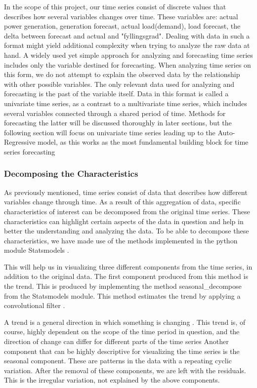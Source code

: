 \documentclass
[twocolumn,
secnumarabic,
nobibnotes,
aps,
prl,
reprint,
groupedaddress,
amsmath,
amssymb,
]{revtex4-2}
\begin{document}
In the scope of this project, our time series consist of discrete values that describes how several variables changes over time. These variables are: actual power generation, generation forecast, actual load(demand), load forecast, the delta between forecast and actual and "fyllingsgrad". Dealing with data in such a format might yield additional complexity when trying to analyze the raw data at hand. A widely used yet simple approach for analyzing and forecasting time series includes only the variable destined for forecasting. When analyzing time series on this form, we do not attempt to explain the observed data by the relationship with other possible variables. The only relevant data used for analyzing and forecasting is the past of the variable itself. Data in this format is called a univariate time series, as a contrast to a multivariate time series, which includes several variables connected through a shared period of time. Methods for forecasting the latter will be discussed thoroughly in later sections, but the following section will focus on univariate time series leading up to the Auto-Regressive model, as this works as the most fundamental building block for time series forecasting \cite{Korstanje2021} 

\subsubsection{Decomposing the Characteristics}
As previously mentioned, time series consist of data that describes how different variables change through time. As a result of this aggregation of data, specific characteristics of interest can be decomposed from the original time series. These characteristics can highlight certain aspects of the data in question and help in better the understanding and analyzing the data. To be able to decompose these characteristics, we have made use of the methods implemented in the python module Statsmodels \cite{seabold2010statsmodels}. 

This will help us in visualizing three different components from the time series, in addition to the original data. The first component produced from this method is the trend. This is produced by implementing the method seasonal\_decompose from the Statsmodels module. This method estimates the trend by applying a convolutional filter \cite{seabold2010statsmodels}. 

A trend is a general direction in which something is changing \cite{Auffarth2021}. This trend is, of course, highly dependent on the scope of the time period in question, and the direction of change can differ for different parts of the time series \cite{Vishwas2020}  
Another component that can be highly descriptive for visualizing the time series is the seasonal component. These are patterns in the data with a repeating cyclic variation. After the removal of these components, we are left with the residuals. This is the irregular variation, not explained by the above components\cite{Vishwas2020}.
\end{document}
